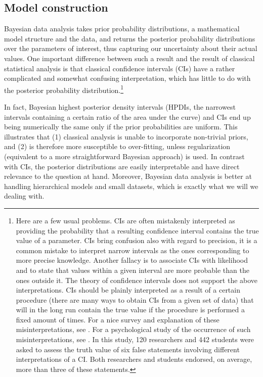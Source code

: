 \documentclass{clv3}
\begin{document}
\label{sec:bayesian}

\hypertarget{model-construction}{%
\subsection{Model construction}\label{model-construction}}

\label{subsec:model}

Bayesian data analysis takes prior probability distributions, a
mathematical model structure and the data, and returns the posterior
probability distributions over the parameters of interest, thus
capturing our uncertainty about their actual values. One important
difference between such a result and the result of classical
statistical analysis is that classical confidence intervals (CIs) have a
rather complicated and somewhat confusing interpretation, which has
little to do with the posterior probability distribution.\footnote{Here
  are a few usual problems. CIs are often mistakenly interpreted as
  providing the probability that a resulting confidence interval
  contains the true value of a parameter. CIs bring confusion also with
  regard to precision, it is a common mistake to interpret narrow
  intervals as the ones corresponding to more precise knowledge.
  Another fallacy is to associate CIs with likelihood and to state that
  values within a given interval are more probable than the ones outside
  it. The theory of confidence intervals does not support the above
  interpretations. CIs should be plainly interpreted as a result of
  a certain procedure (there are many ways to obtain CIs from a given set
  of data) that will in the long run contain the true value if the
  procedure is performed a fixed amount of times. For a nice survey and
  explanation of these misinterpretations, see \citep{Morey2015confidenceFallacy}. For a
  psychological study of the occurrence of such misinterpretations, see
  \citep{Hoekstra2014Misinterpretation}. In this study, 120 researchers and 442 students were asked to
  assess the truth value of six false statements involving different
  interpretations of a CI. Both researchers and students endorsed, on
  average, more than three of these statements.}

In fact, Bayesian highest posterior density intervals (HPDIs, the
narrowest intervals containing a certain ratio of the area under the
curve) and CIs end up being numerically the same only if the prior
probabilities are uniform. This illustrates that (1) classical analysis
is unable to incorporate non-trivial priors, and (2) is therefore more
susceptible to over-fitting, unless regularization (equivalent to a more
straightforward Bayesian approach) is used. In contrast with CIs, the
posterior distributions are easily interpretable and have direct
relevance to the question at hand. Moreover, Bayesian data analysis is
better at handling hierarchical models and small datasets, which is
exactly what we will we dealing with.
\end{document}
